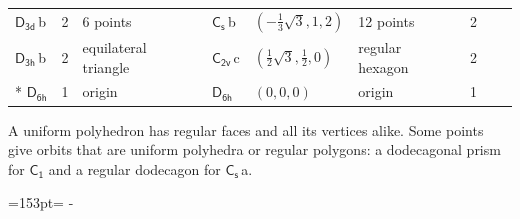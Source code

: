 \documentclass[10pt,a4paper]{article}
\newcommand{\needspace}[1]{\par\penalty-100\begingroup\dimen0=#1\relax\dimen2=\pagegoal
  \advance\dimen2-\pagetotal\ifdim\dimen0>\dimen2\relax\ifdim\dimen2>0pt\vfil\break\fi\fi
  \endgroup}
\numberwithin{equation}{section}
\newcommand{\grp}[1]{\mathsf{#1}}
\newcommand{\clsletter}[1]{\,{\scriptsize\color{black!55}#1}}
\newlength{\fillwidth}\newlength{\cellwidth}\newlength{\colwidth}
\begin{document}
{{\begin{longtable}{@{}lrllllr>{\RaggedRight\arraybackslash}p{\fillwidth}r@{}}
\href{D3d.pdf}{$\grp{D_{3d}}$}\clsletter{b} & 2 & 6 points & \href{C1v.pdf}{$\grp{C_{s}}$}\clsletter{b} & $(-\tfrac{1}{3}\sqrt{3}, 1, 2)$ & 12 points & 2 &  & \\
\href{D3h.pdf}{$\grp{D_{3h}}$}\clsletter{b} & 2 & equilateral triangle & \href{C2v.pdf}{$\grp{C_{2v}}$}\clsletter{c} & $(\tfrac{1}{2}\sqrt{3}, \tfrac{1}{2}, 0)$ & regular hexagon & 2 &  & \\*
\href{D6h.pdf}{$\grp{D_{6h}}$} & 1 & origin & \href{D6h.pdf}{$\grp{D_{6h}}$} & $(0, 0, 0)$ & origin & 1 &  & \\
\bottomrule\end{longtable}}}
A uniform polyhedron has regular faces and all its vertices alike. Some points give orbits that are uniform polyhedra or regular polygons: a dodecagonal prism for \href{C1.pdf}{$\grp{C_{1}}$} and a regular dodecagon for \href{C1v.pdf}{$\grp{C_{s}}$}\clsletter{a}.
\needspace{153pt}
\end{document}
